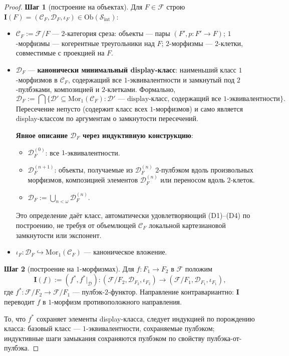 \documentclass[11pt]{article}
\theoremstyle{plain}
\theoremstyle{definition}
\newcommand{\cS}{\mathcal{S}}
\newcommand{\cF}{\mathcal{F}}
\newcommand{\cC}{\mathcal{C}}
\newcommand{\cD}{\mathcal{D}}
\newcommand{\Sint}{\cS_{\mathrm{int}}}
\newcommand{\Ob}{\mathrm{Ob}}
\newcommand{\Mor}{\mathrm{Mor}}
\newcommand{\II}{\mathbf{I}}
\begin{document}
\begin{proof}

\textbf{Шаг 1} (построение на объектах). Для $F \in \cF$ строю $\II(F) = (\cC_F, \cD_F, \iota_F) \in \Ob(\Sint)$:
\begin{itemize}
\item $\cC_F := \cF / F$ — $2$-категория среза: объекты — пары $(F', p : F' \to F)$; $1$-морфизмы — когерентные треугольники над $F$; $2$-морфизмы — $2$-клетки, совместимые с проекцией на $F$.
\item $\cD_F$ — \textbf{канонически минимальный display-класс}: наименьший класс $1$-морфизмов в $\cC_F$, содержащий все $1$-эквивалентности и замкнутый под $2$-пулбэками, композицией и $2$-клетками. Формально,
\[ \cD_F := \bigcap \{\cD' \subseteq \Mor_1(\cC_F) : \cD' \text{ — display-класс, содержащий все } 1\text{-эквивалентности}\}. \]
Пересечение непусто (содержит класс всех $1$-морфизмов) и само является display-классом по аргументам о замкнутости пересечений.

\textbf{Явное описание $\cD_F$ через индуктивную конструкцию}:
\begin{itemize}
\item $\cD_F^{(0)}$: все $1$-эквивалентности.
\item $\cD_F^{(n+1)}$: объекты, получаемые из $\cD_F^{(n)}$ $2$-пулбэком вдоль произвольных морфизмов, композицией элементов $\cD_F^{(n)}$ или переносом вдоль $2$-клеток.
\item $\cD_F := \bigcup_{n < \omega} \cD_F^{(n)}$.
\end{itemize}
Это определение даёт класс, автоматически удовлетворяющий (D1)--(D4) по построению, не требуя от объемлющей $\cC_F$ локальной картезиановой замкнутости или экспонент.

\item $\iota_F : \cD_F \hookrightarrow \Mor_1(\cC_F)$ — каноническое вложение.
\end{itemize}

\textbf{Шаг 2} (построение на $1$-морфизмах). Для $f : F_1 \to F_2$ в $\cF$ положим
\[ \II(f) := (f^*, f^*|_\cD) : (\cF / F_2, \cD_{F_2}, \iota_{F_2}) \to (\cF / F_1, \cD_{F_1}, \iota_{F_1}), \]
где $f^* : \cF / F_2 \to \cF / F_1$ — пулбэк-$2$-функтор. Направление контравариантно: $\II$ переводит $f$ в $1$-морфизм противоположного направления.

То, что $f^*$ сохраняет элементы display-класса, следует индукцией по порождению класса: базовый класс — $1$-эквивалентности, сохраняемые пулбэком; индуктивные шаги замыкания сохраняются пулбэком по свойству пулбэка-от-пулбэка.


\end{proof}
\end{document}
